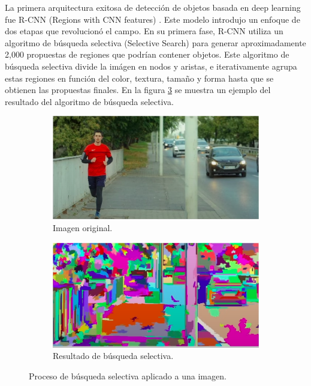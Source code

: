 \documentclass[11pt,spanish,listoffigures,listoftables]{tfgetsinf}
\begin{document}
La primera arquitectura exitosa de detección de objetos basada en deep learning fue R-CNN (Regions with CNN features) \cite{girshick2014richfeaturehierarchiesaccurate}. Este modelo introdujo un enfoque de dos etapas que revolucionó el campo. En su primera fase, R-CNN utiliza un algoritmo de búsqueda selectiva (Selective Search) para generar aproximadamente 2,000 propuestas de regiones que podrían contener objetos. Este algoritmo de búsqueda selectiva divide la imágen en nodos y aristas, e iterativamente agrupa estas regiones en función del color, textura, tamaño y forma hasta que se obtienen las propuestas finales. En la figura \ref{fig:selective_search}\cite{explainningAI} se muestra un ejemplo del resultado del algoritmo de búsqueda selectiva.

\begin{figure}[H]
   \centering
   \begin{subfigure}[b]{0.45\textwidth}
      \centering
      \includegraphics[width=\textwidth]{images/estado_del_arte/selective_search_original.png}
      \caption{Imagen original.}
      \label{fig:selective_search_original}
   \end{subfigure}
   \hfill
   \begin{subfigure}[b]{0.45\textwidth}
      \centering
      \includegraphics[width=\textwidth]{images/estado_del_arte/selective_search_result.png}
      \caption{Resultado de búsqueda selectiva.}     
      \label{fig:selective_search_result}
   \end{subfigure}
   \caption{Proceso de búsqueda selectiva aplicado a una imagen.}
   \label{fig:selective_search}
\end{figure}
\end{document}
